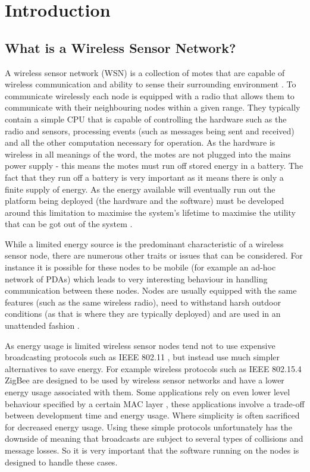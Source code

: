 \section{Introduction}

\subsection{What is a Wireless Sensor Network?}

A wireless sensor network (WSN) is a collection of motes that are capable of wireless communication and ability to sense their surrounding environment \cite{Mica2002,TankBible}. To communicate wirelessly each node is equipped with a radio that allows them to communicate with their neighbouring nodes within a given range. They typically contain a simple CPU that is capable of controlling the hardware such as the radio and sensors, processing events (such as messages being sent and received) and all the other computation necessary for operation. As the hardware is wireless in all meanings of the word, the motes are not plugged into the mains power supply - this means the motes must run off stored energy in a battery. The fact that they run off a battery is very important as it means there is only a finite supply of energy. As the energy available will eventually run out the platform being deployed (the hardware and the software) must be developed around this limitation to maximise the system's lifetime to maximise the utility that can be got out of the system \cite{1331424}.

While a limited energy source is the predominant characteristic of a wireless sensor node, there are numerous other traits or issues that can be considered. For instance it is possible for these nodes to be mobile (for example an ad-hoc network of PDAs) \cite{4224091} which leads to very interesting behaviour in handling communication between these nodes. Nodes are usually equipped with the same features (such as the same wireless radio), need to withstand harsh outdoor conditions (as that is where they are typically deployed) \cite{SzewczykPMC04, Werner-Allen:2006:FYV:1298455.1298491} and are used in an unattended fashion \cite{1437066}.

As energy usage is limited wireless sensor nodes tend not to use expensive broadcasting protocols such as IEEE 802.11 \cite{Mica2002}, but instead use much simpler alternatives to save energy. For example wireless protocols such as IEEE 802.15.4 ZigBee \cite{1253873, 4014617} are designed to be used by wireless sensor networks and have a lower energy usage associated with them. Some applications rely on even lower level behaviour specified by a certain MAC layer \cite{5751321,4469515,?,BMAC,SMAC,XMAC}, these applications involve a trade-off between development time and energy usage. Where simplicity is often sacrificed for decreased energy usage. Using these simple protocols unfortunately has the downside of meaning that broadcasts are subject to several types of collisions and message losses. So it is very important that the software running on the nodes is designed to handle these cases.

